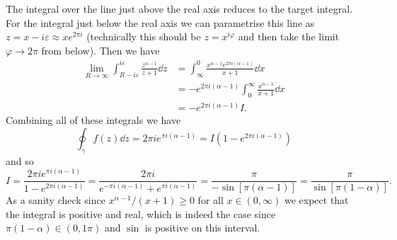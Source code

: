\documentclass{article}
\begin{document}
\begin{example}
        The integral over the line just above the real axis reduces to the target integral.
        For the integral just below the real axis we can parametrise this line as \(z = x - i\varepsilon \approx xe^{2\pi i}\) (technically this should be \(z = x^{i\varphi}\) and then take the limit \(\varphi \to 2\pi\) from below).
        Then we have
        \begin{align*}
            \lim_{R\to\infty} \int_{R - i\varepsilon}^{i\varepsilon} \frac{z^{\alpha - 1}}{z + 1}\dd{z} &= \int_{\infty}^{0} \frac{x^{\alpha - 1}e^{2\pi i(\alpha - 1)}}{x + 1} \dd{x}\\
            &= -e^{2\pi i(\alpha - 1)}\int_{0}^{\infty} \frac{x^{\alpha - 1}}{x + 1} \dd{x}\\
            &= -e^{2\pi i(\alpha - 1)} I.
        \end{align*}
        Combining all of these integrals we have
        \[\oint_{\gamma} f(z) \dd{z} = 2\pi ie^{\pi i(\alpha - 1)} = I(1 - e^{2\pi i(\alpha - 1)})\]
        and so
        \[I = \frac{2\pi ie^{\pi i(\alpha - 1)}}{1 - e^{2\pi i(\alpha - 1)}} = \frac{2\pi i}{e^{-\pi i(\alpha - 1)} + e^{\pi i(\alpha - 1)}} = \frac{\pi}{-\sin[\pi(\alpha - 1)]} = \frac{\pi}{\sin[\pi(1 - \alpha)]}.\]
        As a sanity check since \(x^{\alpha - 1}/(x + 1) \ge 0\) for all \(x \in (0, \infty)\) we expect that the integral is positive and real, which is indeed the case since \(\pi(1 - \alpha)\in(0, 1\pi)\) and \(\sin\) is positive on this interval.
    \end{example}
    
\end{document}
